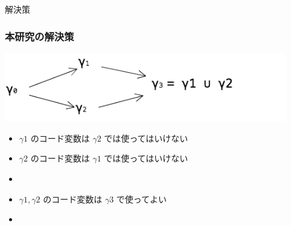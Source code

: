 






\begin{frame}
  \center
  \huge{解決策}
\end{frame}

\begin{frame}
  \frametitle{本研究の解決策}
  \flushleft
  \includegraphics[clip,height=3cm]{./img/ecgraph.png}
  \begin{itemize}
  \item<2-> $\gamma1$ のコード変数は $\gamma2$ では使ってはいけない
  \item<2-> $\gamma2$ のコード変数は $\gamma1$ では使ってはいけない
  \item<3->[$\Rightarrow$] 
  \end{itemize}

  \begin{itemize}
  \item<4-> $\gamma1, \gamma2$ のコード変数は $\gamma3$ で使ってよい
  \item<5->[$\Rightarrow$]  %
  \end{itemize}
\end{frame}

